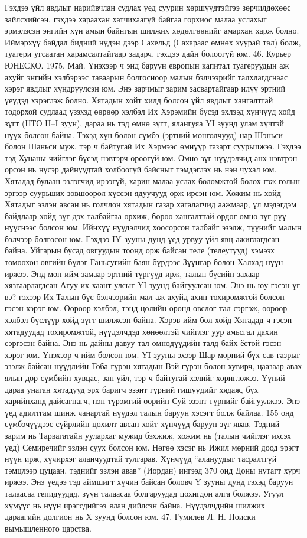 Гэхдээ үйл явдлыг нарийвчлан судлах үед суурин хөршүүдтэйгээ зөрчилдөхөөс зайлсхийсэн, гэхдээ хараахан хатчихаагүй байгаа горхиос малаа услахыг эрмэлзсэн энгийн хүн амын байнгын шилжих хөдөлгөөнийг амархан харж болно. Иймэрхүү байдал бидний нүдэн дээр Сахельд (Сахараас өмнөх хуурай тал) болж, туагери угсаатан харамсалтайгаар задарч, гэхдээ дайн болоогүй юм. 46. Курьер ЮНЕСКО. 1975. Май.
Үнэхээр ч энд баруун европын капитал туагеруудын аж ахуйг энгийн хэлбэрээс таваарын болгосноор малын бэлчээрийг талхлагдснаас хэрэг явдлыг хүндрүүлсэн юм. Энэ зарчмыг зарим засвартайгаар илүү эртний үеүдэд хэрэглэж болно.
Хятадын хойт хилд болсон үйл явдлыг хангалттай тодорхой судлаад үзэхэд өөрөөр хэлбэл Их Хэрэмийн бүсэд эхлээд хүнчүүд хойд зүгт (НТӨ II–I зуун), дараа нь тэд өмнө зүгт, ялангуяа YI зуунд улам хүчтэй нүүх болсон байна. Тэхэд хүн болон сүмбэ (эртний монголчууд) нар Шэньси болон Шаньси муж, тэр ч байтугай Их Хэрмээс өмнүүр газарт суурьшжээ. Гэхдээ тэд Хунаны чийглэг бүсэд нэвтэрч ороогүй юм.
Өмнө зүг нүүдэлчид анх нэвтрэн орсон нь нүсэр дайнуудтай холбоогүй байсныг тэмдэглэх нь нэн чухал юм. Хятадад булаан эзлэгчид ирээгүй, харин малаа услах боломжтой болох гэж голын эргээр суурьших зөвшөөрөл хүссэн ядуучууд орж ирсэн юм. Хожим нь хойд Хятадыг эзлэн авсан нь голчлон хятадын газар хагалагчид аажмаар, үл мэдэгдэм байдлаар хойд зүг дэх талбайгаа орхиж, бороо хангалттай ордог өмнө зүг рүү нүүснээс болсон юм. Ийнхүү нүүдэлчид хоосорсон талбайг эзэлж, түүнийг малын бэлчээр болгосон юм.
Гэхдээ IY зууны дунд үед урвуу үйл явц ажиглагдсан байна. Уйгарын бусад овгуудын тоонд орж байсан теле (телеутууд) хэмээх томоохон овгийн бүлэг Ганьсугийн баян бүрдээс Зүүнгар болон Халхад нүүн иржээ. Энд мөн ийм замаар эртний түргүүд ирж, талын бүсийн захаар хязгаарлагдсан Агуу их хаант улсыг YI зуунд байгуулсан юм.
Энэ нь юу гэсэн үг вэ? гэхээр Их Талын бүс бэлчээрийн мал аж ахуйд ахин тохиромжтой болсон гэсэн хэрэг юм. Өөрөөр хэлбэл, тэнд цөлийн оронд өвслөг тал сэргэж, өөрөөр хэлбэл бүслүүр хойд зүгт шилжсэн байна. Хэрэв ийм бол хойд Хятадад ч гэсэн хятадуудад тохиромжтой, нүүдэлчдэд хөнөөлтэй чийглэг уур амьсгал дахин сэргэсэн байна. Энэ нь дайны давуу тал өмнөдүүдийн талд байх ёстой гэсэн хэрэг юм. Үнэхээр ч ийм болсон юм. YI зууны эхээр Шар мөрний бүх сав газрыг эзэлж байсан нүүдлийн Тоба гүрэн хятадын Вэй гүрэн болон хувирч, цаазаар авах ялын дор сүмбийн хувцас, зан үйл, тэр ч байтугай хэлийг хоригложээ. Үүний дараа унаган хятадууд эрх баригч эзэнт гүрний гишүүдийг хядаж, бүх харийнханд дайсагнагч, нэн түрэмгий өөрийн Суй эзэнт гүрнийг байгуулжээ.
Энэ үед адилтгам шинж чанартай нүүдэл талын баруун хэсэгт болж байлаа. 155 онд сүмбэчүүдээс сүйрлийн цохилт авсан хойт хүнчүүд баруун зүг явав. Тэдний зарим нь Тарвагатайн уулархаг мужид бэхжиж, хожим нь (талын чийглэг ихсэх үед) Семиречийг эзлэн суух болсон юм. Нөгөө хэсэг нь Ижил мөрний доод эрэгт нүүн ирж, хүчирхэг аланчуудтай тулгарав. Хүнчүүд “алануудыг тасралтгүй тэмцлээр цуцаан, тэднийг эзлэн авав” (Иордан) ингээд 370 онд Доны нутагт хүрч иржээ. Энэ үедээ тэд аймшигт хүчин байсан боловч Y зууны дунд гэхэд баруун талаасаа гепидуудад, зүүн талаасаа болгаруудад цохигдон алга болжээ. Угуул хүмүүс нь нүүн ирэгсдийгээ ялан дийлсэн байна. Нүүдэлчдийн шилжих дараагийн долгион нь X зуунд болсон юм. 47. Гумилев Л. Н. Поиски вымышленного царства.
